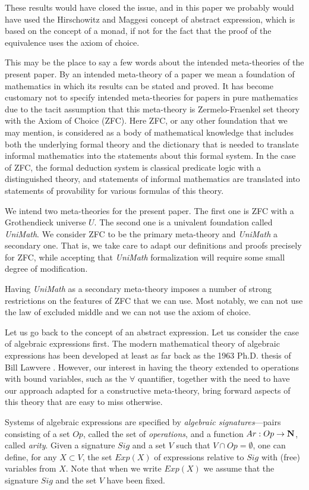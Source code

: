 \documentclass[12pt]{amsart}
\newcommand{\sr}{\rightarrow}
\newcommand{\nn}{{\bf N\rm}}
\newcommand{\nat}{\nn}
\begin{document}
These results would have closed the issue, and in
this paper we probably would have used the Hirschowitz and
Maggesi concept of abstract expression, which is based
on the concept of a monad, if not for the fact that the proof of the equivalence
uses the axiom of choice.

This may be the place to say a few words about the intended meta-theories of
the present paper. By an intended meta-theory of a paper we mean a foundation
of mathematics in which its results can be stated and proved. It has become
customary not to specify intended meta-theories for papers in pure mathematics
due to the tacit assumption that this meta-theory is Zermelo-Fraenkel set
theory with the Axiom of Choice (ZFC).  Here ZFC, or any other foundation that we
may mention, is considered as a body of mathematical knowledge that includes
both the underlying formal theory and the dictionary that is needed to
translate informal mathematics into the statements about this formal system. In
the case of ZFC, the formal deduction system is classical predicate logic
with a distinguished theory, and statements of informal mathematics are
translated into statements of provability for various formulas of this
theory.

We intend two meta-theories for the present paper. The first one is 
ZFC with a Grothendieck universe $U$. The second one is a univalent foundation
called {\em UniMath}.  We consider ZFC to be the primary meta-theory and {\em UniMath} a
secondary one. That is, we take care to adapt our definitions and proofs
precisely for ZFC, while accepting that {\em UniMath} formalization will require
some small degree of modification.

Having {\em UniMath} as a secondary meta-theory imposes a number of strong
restrictions on the features of ZFC that we can use.  Most
notably, we can not use the law of excluded middle and we can not use the axiom
of choice.

Let us go back to the concept of an abstract expression. Let us consider the
case of algebraic expressions first.  The modern mathematical theory of algebraic
expressions has been developed at least as far back as the 1963 Ph.D.{} thesis of
Bill Lawvere \cite{Lawvere}. However, our interest in having the theory
extended to operations with bound variables, such as the $\forall$
quantifier, together with the need to have our approach adapted for a
constructive meta-theory, bring forward aspects of this theory that are easy to
miss otherwise.

Systems of algebraic expressions are specified by {\em algebraic signatures}---pairs
consisting of a set $Op$, called the set of {\em operations}, and a function
$Ar:Op\sr \nat$, called {\em arity}.  Given a signature $Sig$ and a set $V$ such that
$V\cap Op=\emptyset$, one can define, for any $X\subset V$, the set $Exp(X)$ of
expressions relative to $Sig$ with (free) variables from $X$. Note that when we
write $Exp(X)$ we assume that the signature $Sig$ and the set $V$ have been
fixed.
\end{document}
